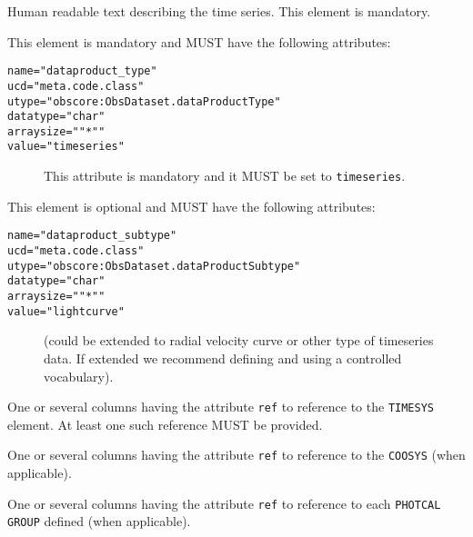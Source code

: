 \documentclass[11pt,a4paper]{ivoa}
\let\fg=\color
\def\attr#1{{\tt{\fg{DarkRed}#1}}}
\def\elem#1{{\tt{\fg{DarkRed}#1}}}
\def\attrval#1#2{{\tt{\fg{DarkRed}#1}="{\fg{DarkPurple}#2}"}}
\begin{document}
\begin{description}
     \item[\attr{DESCRIPTION}] Human readable text describing the time series. This element is mandatory. 
     \item[\elem{PARAM}] This element is mandatory and MUST have the following attributes:
     \begin{description}
        \item[\attrval{name}{dataproduct\_type}]
        \item[\attrval{ucd}{meta.code.class}]
        \item[\attrval{utype}{obscore:ObsDataset.dataProductType}] 
        \item[\attrval{datatype}{char}]
         \item[\attrval{arraysize}{"*"}]
        \item[\attrval{value}{timeseries}] This attribute is mandatory and it MUST be set to \verb|timeseries|. 
     \end{description}
     \item[\elem{PARAM}] This element is optional and MUST have the following attributes:  
     \begin{description}
        \item[\attrval{name}{dataproduct\_subtype}]
        \item[\attrval{ucd}{meta.code.class}]
        \item[\attrval{utype}{obscore:ObsDataset.dataProductSubtype}] 
        \item[\attrval{datatype}{char}]
        \item[\attrval{arraysize}{"*"}]
        \item[\attrval{value}{lightcurve}] (could be extended to radial velocity curve or other type of timeseries data. If extended we recommend defining and using a controlled vocabulary). 
     \end{description}
     \item One or several columns having the attribute \elem{ref} to reference to the \elem{TIMESYS} element. At least one such reference MUST be provided.
     \item One or several columns having the attribute \elem{ref} to reference to the \elem{COOSYS} (when applicable). 
     \item One or several columns having the attribute \elem{ref} to reference to each \texttt{PHOTCAL} \elem{GROUP} defined (when applicable). 
\end{description}
\end{document}
